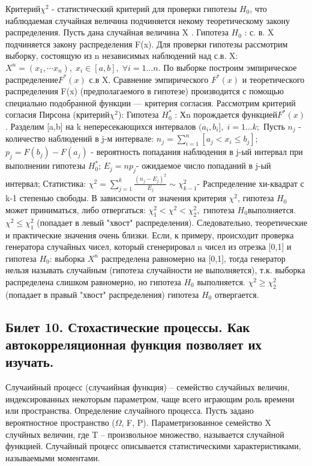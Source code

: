 \documentclass[a4paper, 12pt]{article}
\begin{document}
	Критерий$ \chi^2$ - статистический критерий для проверки гипотезы  $H_0$, что наблюдаемая случайная величина подчиняется некому теоретическому закону распределения.
	Пусть дана случайная величина X .
	Гипотеза  $H_0$ : с. в. X подчиняется закону распределения F(x).
	Для проверки гипотезы рассмотрим выборку, состоящую из n независимых наблюдений над с.в. X: $ X^n = \left( x_1, \cdots x_n \right), \; x_i \in \left[ a, b \right], \; \forall i=1 \dots n $. По выборке построим эмпирическое распределение$ F^*(x)$ с.в X. Сравнение эмпирического $F^*(x)$ и теоретического распределения F(x) (предполагаемого в гипотезе) производится с помощью специально подобранной функции — критерия согласия. Рассмотрим критерий согласия Пирсона (критерий$ \chi^2$):
	Гипотеза  $H_0^*$ : Хn порождается функцией$ F^*(x)$.
	Разделим [a,b] на k непересекающихся интервалов  $(a_i, b_i], \; i=1 \dots k;$
	Пусть $n_j$ - количество наблюдений в j-м интервале:  $n_j = \sum_{i=1}^n \left[ a_j <x_i \leq b_j \right] $;
	$p_j = F(b_j)-F(a_j)$ - вероятность попадания наблюдения в j-ый интервал при выполнении гипотезы  $H_0^* $;
	$E_j = np_j $- ожидаемое число попаданий в j-ый интервал;
	Статистика: $\chi^2 = \sum_{j=1}^k \frac{ \left( n_j-E_j \right)^2}{E_j} \sim \chi_{k-1}^2 $- Распределение хи-квадрат с k-1 степенью свободы.
	В зависимости от значения критерия $\chi^2$, гипотеза $H_0 $может приниматься, либо отвергаться:
	$\chi^2_1 < \chi^2 < \chi^2_2,$ гипотеза $H_0 $выполняется.
	$\chi^2 \leq \chi^2_1$ (попадает в левый "хвост" распределения). Следовательно, теоретические и практические значения очень близки. Если, к примеру, происходит проверка генератора случайных чисел, который сгенерировал n чисел из отрезка [0,1] и гипотеза $H_0$: выборка $X^n$ распределена равномерно на [0,1], тогда генератор нельзя называть случайным (гипотеза случайности не выполняется), т.к. выборка распределена слишком равномерно, но гипотеза $H_0$ выполняется.
	$\chi^2 \geq \chi^2_2$ (попадает в правый "хвост" распределения) гипотеза $H_0$ отвергается.
	
	\subsection*{Билет 10.  Стохастические процессы. Как автокорреляционная функция позволяет их изучать.}
	Случаийный процесс (случаийная функция) – семейство случайных величин, индексированных некоторым параметром, чаще всего играющим роль времени или пространства.
	Определение случайного процесса.
	Пусть задано вероятностное пространство ($\Omega$, F, P). Параметризованное семейство X случйных величин, где T – произвольное множество, называется случайной функцией.
    Случайный процесс описывается статистическими характеристиками, называемыми моментами.
\end{document}
